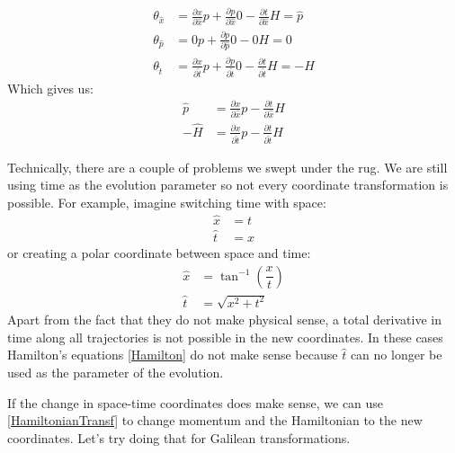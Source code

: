 \documentclass[aps,pra,10pt,floatfix,nofootinbib]{revtex4-1}
\theoremstyle{definition}
\begin{document}
\begin{equation}
\begin{aligned}
\theta_{\hat{x}} &= \frac{\partial x}{\partial \hat{x}}p + \frac{\partial p}{\partial \hat{x}}0 - \frac{\partial t}{\partial \hat{x}}H = \hat{p} \\
\theta_{\hat{p}} &= 0 p + \frac{\partial p}{\partial \hat{p}}0 - 0 H = 0 \\
\theta_{\hat{t}} &= \frac{\partial x}{\partial \hat{t}}p + \frac{\partial p}{\partial \hat{t}}0 - \frac{\partial t}{\partial \hat{t}}H = -\hat{H}
\end{aligned}
\end{equation}
Which gives us:
\begin{equation}
\begin{aligned}
\hat{p} &= \frac{\partial x}{\partial \hat{x}}p - \frac{\partial t}{\partial \hat{x}}H \\
-\hat{H} &= \frac{\partial x}{\partial \hat{t}}p  - \frac{\partial t}{\partial \hat{t}}H
\end{aligned}
\label{HamiltonianTransf}
\end{equation}

Technically, there are a couple of problems we swept under the rug. We are still using time as the evolution parameter so not every coordinate transformation is possible. For example, imagine switching time with space:
\begin{equation}
\begin{aligned}
\hat{x} &= t \\
\hat{t} &= x
\end{aligned}
\end{equation}
or creating a polar coordinate between space and time:
\begin{equation}
\begin{aligned}
\hat{x} &= \tan^{-1}(\dfrac{x}{t}) \\
\hat{t} &= \sqrt{x^2 + t^2}
\end{aligned}
\end{equation}
Apart from the fact that they do not make physical sense, a total derivative in time along all trajectories is not possible in the new coordinates. In these cases Hamilton's equations \eqref{Hamilton} do not make sense because $\hat{t}$ can no longer be used as the parameter of the evolution.

If the change in space-time coordinates does make sense, we can use \eqref{HamiltonianTransf} to change momentum and the Hamiltonian to the new coordinates. Let's try doing that for Galilean transformations.
\end{document}
